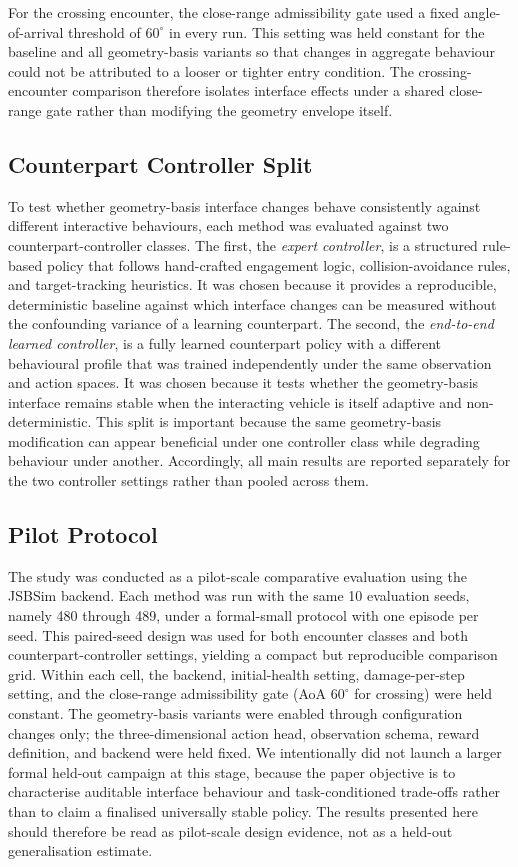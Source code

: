 \documentclass[drones,article,submit,pdftex,moreauthors]{Definitions/mdpi}
\begin{document}
For the crossing encounter, the close-range admissibility gate used a fixed angle-of-arrival threshold of $60^\circ$ in every run. This setting was held constant for the baseline and all geometry-basis variants so that changes in aggregate behaviour could not be attributed to a looser or tighter entry condition. The crossing-encounter comparison therefore isolates interface effects under a shared close-range gate rather than modifying the geometry envelope itself.

\subsection{Counterpart Controller Split}

To test whether geometry-basis interface changes behave consistently against different interactive behaviours, each method was evaluated against two counterpart-controller classes. The first, the \emph{expert controller}, is a structured rule-based policy that follows hand-crafted engagement logic, collision-avoidance rules, and target-tracking heuristics. It was chosen because it provides a reproducible, deterministic baseline against which interface changes can be measured without the confounding variance of a learning counterpart. The second, the \emph{end-to-end learned controller}, is a fully learned counterpart policy with a different behavioural profile that was trained independently under the same observation and action spaces. It was chosen because it tests whether the geometry-basis interface remains stable when the interacting vehicle is itself adaptive and non-deterministic. This split is important because the same geometry-basis modification can appear beneficial under one controller class while degrading behaviour under another. Accordingly, all main results are reported separately for the two controller settings rather than pooled across them.

\subsection{Pilot Protocol}

The study was conducted as a pilot-scale comparative evaluation using the JSBSim backend. Each method was run with the same 10 evaluation seeds, namely 480 through 489, under a formal-small protocol with one episode per seed. This paired-seed design was used for both encounter classes and both counterpart-controller settings, yielding a compact but reproducible comparison grid. Within each cell, the backend, initial-health setting, damage-per-step setting, and the close-range admissibility gate (AoA $60^\circ$ for crossing) were held constant. The geometry-basis variants were enabled through configuration changes only; the three-dimensional action head, observation schema, reward definition, and backend were held fixed. We intentionally did not launch a larger formal held-out campaign at this stage, because the paper objective is to characterise auditable interface behaviour and task-conditioned trade-offs rather than to claim a finalised universally stable policy. The results presented here should therefore be read as pilot-scale design evidence, not as a held-out generalisation estimate.
\end{document}
